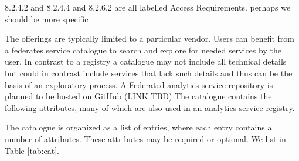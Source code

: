 \documentclass[12pt]{article}
\begin{document}
8.2.4.2 and 8.2.4.4 and 8.2.6.2 are all labelled Access Requirements. perhaps we should be more specific

 The offerings are typically limited to a particular vendor. Users can benefit from a federates service catalogue  to search and explore for needed services by the user. In contrast to a registry a catalogue may not include all technical details but could in contrast include services that lack such details and thus can be the basis of an exploratory process.  A Federated analytics service repository is planned to be hosted on GitHub (LINK TBD)
The catalogue contains the following attributes, many of which are also used in an analytics service registry.

The catalogue is organized as a list of entries, where each entry contains a number of attributes. These attributes may be required or optional. We list in Table \ref{tab:cat}. 
\end{document}

